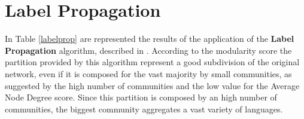     \begin{table}[H]
        \centering
        \begin{subtable}{\textwidth}
        \end{subtable}
        \caption{Evaluation of the partitions obtained by the application of the K-Clique algorithm.}
        \label{kclique}
    \end{table}


\section{Label Propagation} %
\label{sec:label_propagation}
    In Table \ref{labelprop} are represented the results of the application of the \textbf{Label Propagation}
    algorithm, described in \cite{label_propagation}. According to the modularity score the partition provided by
    this algorithm represent a good subdivision of the original network, even if it is composed for the vast
    majority by small communities, as suggested by the high number of communities and the low value for the
    Average Node Degree score. Since this partition is composed by an high number of communities, the biggest
    community aggregates a vast variety of languages.

